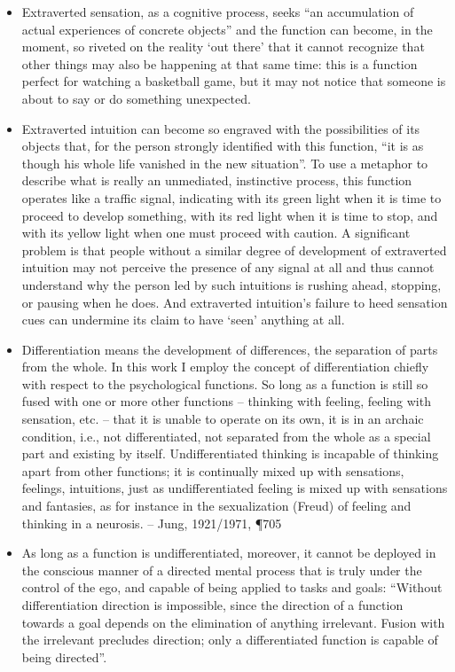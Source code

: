 \begin{itemize}
\item Extraverted sensation, as a cognitive process, seeks ``an accumulation of
actual experiences of concrete objects'' and the function can become, in the
moment, so riveted on the reality `out there' that it cannot recognize that
other things may also be happening at that same time: this is a function
perfect for watching a basketball game, but it may not notice that someone is
about to say or do something unexpected.

\item Extraverted intuition can become so engraved with the possibilities of its
objects that, for the person strongly identified with  this function, ``it is
as though his whole life vanished in the new situation''.  To use a metaphor to
describe what is really an unmediated, instinctive process, this function
operates like a traffic signal, indicating with its green light when it is time
to proceed to develop something, with its red light when it is time to stop,
and with its yellow light when one must proceed with caution. A significant
problem is that people without a similar degree of development of extraverted
intuition may not perceive the presence of any signal at all and thus cannot
understand why the person led by such intuitions is rushing ahead, stopping, or
pausing when he does. And extraverted intuition's failure to heed sensation
cues can undermine its claim to have `seen' anything at all.

\item Differentiation means the development of differences, the separation of
parts from the whole.  In this work I employ the concept of differentiation
chiefly with respect to the psychological functions.  So long as a function is
still so fused with one or more other functions -- thinking with feeling,
feeling with sensation, etc. -- that it is unable to operate on its own, it is
in an archaic condition, i.e., not differentiated, not separated from the whole
as a special part and existing by itself. Undifferentiated thinking is
incapable of thinking apart from other functions; it is continually mixed up
with sensations, feelings, intuitions, just as undifferentiated feeling is
mixed up with sensations and fantasies, as for instance in the sexualization
(Freud) of feeling and thinking in a neurosis. -- Jung, 1921/1971, \P 705

\item As long as a function is undifferentiated, moreover, it cannot be
deployed in the conscious manner of a directed mental process that is truly
under the control of the ego, and capable of being applied to tasks and goals:
``Without differentiation direction is impossible, since the direction of a
function towards a goal depends on the elimination of anything irrelevant.
Fusion with the irrelevant precludes direction; only a differentiated function
is capable of being directed''.


\end{itemize}
